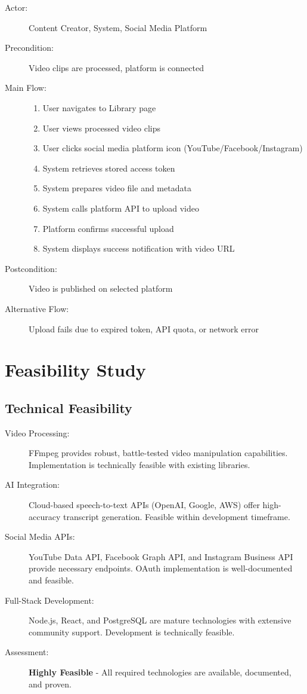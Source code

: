 \begin{description}
    \item[Actor:] Content Creator, System, Social Media Platform
    \item[Precondition:] Video clips are processed, platform is connected
    \item[Main Flow:] 
    \begin{enumerate}
        \item User navigates to Library page
        \item User views processed video clips
        \item User clicks social media platform icon (YouTube/Facebook/Instagram)
        \item System retrieves stored access token
        \item System prepares video file and metadata
        \item System calls platform API to upload video
        \item Platform confirms successful upload
        \item System displays success notification with video URL
    \end{enumerate}
    \item[Postcondition:] Video is published on selected platform
    \item[Alternative Flow:] Upload fails due to expired token, API quota, or network error
\end{description}

\section{Feasibility Study}

\subsection{Technical Feasibility}

\begin{description}
    \item[Video Processing:] FFmpeg provides robust, battle-tested video manipulation capabilities. Implementation is technically feasible with existing libraries.
    
    \item[AI Integration:] Cloud-based speech-to-text APIs (OpenAI, Google, AWS) offer high-accuracy transcript generation. Feasible within development timeframe.
    
    \item[Social Media APIs:] YouTube Data API, Facebook Graph API, and Instagram Business API provide necessary endpoints. OAuth implementation is well-documented and feasible.
    
    \item[Full-Stack Development:] Node.js, React, and PostgreSQL are mature technologies with extensive community support. Development is technically feasible.
    
    \item[Assessment:] \textbf{Highly Feasible} - All required technologies are available, documented, and proven.
\end{description}

